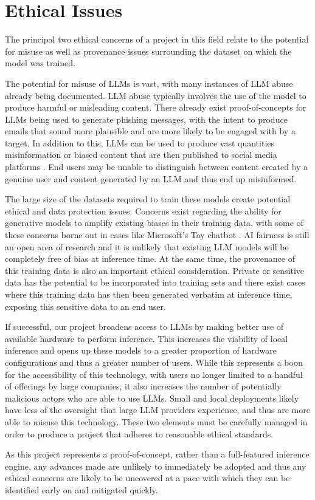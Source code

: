 \documentclass[12pt,twoside]{report}
\begin{document}
\chapter{Ethical Issues} %
The principal two ethical concerns of a project in this field relate to the potential for misuse as well as provenance issues surrounding the dataset on which the model was trained.

The potential for misuse of LLMs is vast, with many instances of LLM abuse already being documented.
LLM abuse typically involves the use of the model to produce harmful or misleading content.
There already exist proof-of-concepts for LLMs \cite{hazell2023spear} being used to generate phishing messages, with the intent to produce emails that sound more plausible and are more likely to be engaged with by a target.
In addition to this, LLMs can be used to produce vast quantities misinformation or biased content that are then published to social media platforms \cite{williams2024large}. 
End users may be unable to distinguish between content created by a genuine user and content generated by an LLM and thus end up misinformed.

The large size of the datasets required to train these models create potential ethical and data protection issues.
Concerns exist regarding the ability for generative models to amplify existing biases in their training data, with some of these concerns borne out in cases like Microsoft's Tay chatbot \cite{tayMicrosoft}.
AI fairness is still an open area of research \cite{xivuri2021systematic} and it is unlikely that existing LLM models will be completely free of bias at inference time.
At the same time, the provenance of this training data is also an important ethical consideration.
Private or sensitive data has the potential to be incorporated into training sets and there exist cases \cite{nasr2023scalable} where this training data has then been generated verbatim at inference time, exposing this sensitive data to an end user.

If successful, our project broadens access to LLMs by making better use of available hardware to perform inference.
This increases the viability of local inference and opens up these models to a greater proportion of hardware configurations and thus a greater number of users.
While this represents a boon for the accessibility of this technology, with users no longer limited to a handful of offerings by large companies, it also increases the number of potentially malicious actors who are able to use LLMs.
Small and local deployments likely have less of the oversight that large LLM providers experience, and thus are more able to misuse this technology.
These two elements must be carefully managed in order to produce a project that adheres to reasonable ethical standards.

As this project represents a proof-of-concept, rather than a full-featured inference engine, any advances made are unlikely to immediately be adopted and thus any ethical concerns are likely to be uncovered at a pace with which they can be identified early on and mitigated quickly.




\end{document}

